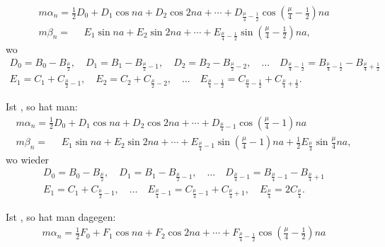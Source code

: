 \begin{landscape}
\[
\tag*{1)}
\begin{array}{l}
m\alpha_n = \tfrac{1}{2}D_0 + D_1\cos na + D_2\cos 2na + \cdots + D_{\frac{\mu}{4}-\frac{1}{2}}\cos\left(\frac{\mu}{4}-\frac{1}{2}\right)na \\[4pt]
m\beta_n = \phantom{{}={}} E_1\sin na + E_2\sin 2na + \cdots + E_{\frac{\mu}{4}-\frac{1}{2}}\sin\left(\frac{\mu}{4}-\frac{1}{2}\right)na,
\end{array}
\]
wo
\[
\begin{gathered}
D_0 = B_0 - B_{\frac{\mu}{2}}, \quad D_1 = B_1 - B_{\frac{\mu}{2}-1}, \quad D_2 = B_2 - B_{\frac{\mu}{2}-2}, \quad \ldots \quad D_{\frac{\mu}{4}-\frac{1}{2}} = B_{\frac{\mu}{4}-\frac{1}{2}} - B_{\frac{\mu}{4}+\frac{1}{2}}\\[4pt]
E_1 = C_1 + C_{\frac{\mu}{2}-1}, \quad E_2 = C_2 + C_{\frac{\mu}{2}-2}, \quad \ldots \quad E_{\frac{\mu}{4}-\frac{1}{2}} = C_{\frac{\mu}{4}-\frac{1}{2}} + C_{\frac{\mu}{4}+\frac{1}{2}}.
\end{gathered}
\]
\par\noindent\hspace*{\parindent}Ist , so hat man:
\[
\tag*{2)}
\begin{array}{l}
m\alpha_n = \tfrac{1}{2}D_0 + D_1\cos na + D_2\cos 2na + \cdots + D_{\frac{\mu}{4}-1}\cos\left(\frac{\mu}{4}-1\right)na \\[4pt]
m\beta_n = \phantom{{}={}} E_1\sin na + E_2\sin 2na + \cdots + E_{\frac{\mu}{4}-1}\sin\left(\frac{\mu}{4}-1\right)na + \tfrac{1}{2}E_{\frac{\mu}{4}}\sin\frac{\mu}{4}na,
\end{array}
\]
wo wieder
\[
\begin{gathered}
D_0 = B_0 - B_{\frac{\mu}{2}}, \quad D_1 = B_1 - B_{\frac{\mu}{2}-1}, \quad \ldots \quad D_{\frac{\mu}{4}-1} = B_{\frac{\mu}{4}-1} - B_{\frac{\mu}{4}+1}\\[4pt]
E_1 = C_1 + C_{\frac{\mu}{2}-1}, \quad \ldots \quad E_{\frac{\mu}{4}-1} = C_{\frac{\mu}{4}-1} + C_{\frac{\mu}{4}+1}, \quad E_{\frac{\mu}{4}} = 2C_{\frac{\mu}{4}}.
\end{gathered}
\]
\par\noindent\hspace*{\parindent}Ist , so hat man dagegen:
\[
\tag*{3)}
\begin{array}{l}
m\alpha_n = \tfrac{1}{2}F_0 + F_1\cos na + F_2\cos 2na + \cdots + F_{\frac{\mu}{4}-\frac{1}{2}}\cos\left(\frac{\mu}{4}-\frac{1}{2}\right)na \\[4pt]

\end{array}\]
\end{landscape}
